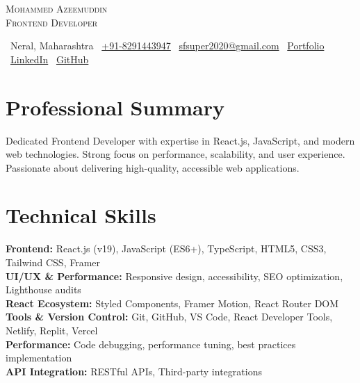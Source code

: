 \documentclass[letterpaper,9pt]{article}
\newcommand{\skillItem}[2]{
    \textbf{\color{darkgray}#1:} \small{#2}
}
\begin{document}
\begin{center}
    {\LARGE\color{primaryblue}\scshape Mohammed Azeemuddin} \\ \vspace{1pt}
    {\large\color{darkgray}\scshape Frontend Developer} \\ \vspace{3pt}

    \footnotesize\color{lightgray}
    \faMapMarker\ Neral, Maharashtra \quad
    \faPhone\ \href{tel:+8291443947}{+91-8291443947} \quad
    \faEnvelope\ \href{mailto:sfsuper2020@gmail.com}{sfsuper2020@gmail.com} \quad
    \faGlobe\ \href{https://mohdazimuddinport.netlify.app}{Portfolio} \quad
    \faLinkedin\ \href{https://linkedin.com/in/mohd-azimuddin-shaikh-34284b202}{LinkedIn} \quad
    \faGithub\ \href{https://github.com/MohdAzimuddin}{GitHub}
\end{center}

\section{Professional Summary}
\small{Dedicated Frontend Developer with expertise in React.js, JavaScript, and modern web technologies. Strong focus on performance, scalability, and user experience. Passionate about delivering high-quality, accessible web applications.}

\section{Technical Skills}
\vspace{-12pt}
\begin{multicols}{2}
\small
\skillItem{Frontend}{React.js (v19), JavaScript (ES6+), TypeScript, HTML5, CSS3, Tailwind CSS, Framer} \\[3pt]
\skillItem{UI/UX \& Performance}{Responsive design, accessibility, SEO optimization, Lighthouse audits} \\[3pt]
\skillItem{React Ecosystem}{Styled Components, Framer Motion, React Router DOM} \\[3pt]
\skillItem{Tools \& Version Control}{Git, GitHub, VS Code, React Developer Tools, Netlify, Replit, Vercel} \\[3pt]
\skillItem{Performance}{Code debugging, performance tuning, best practices implementation} \\[3pt]
\skillItem{API Integration}{RESTful APIs, Third-party integrations}
\end{multicols}
\vspace{-12pt}
\end{document}
